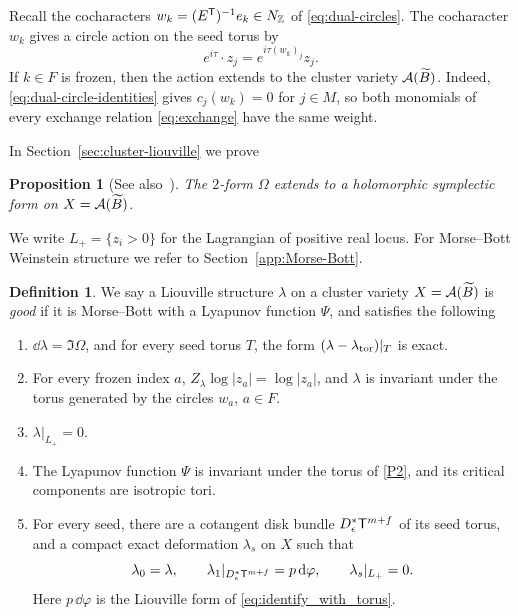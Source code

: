 \documentclass[12pt, letter]{amsart}
\newtheorem{proposition}[dummy]{Proposition}
\theoremstyle{definition}
\newtheorem{definition}[dummy]{Definition}
\begin{document}
Recall the cocharacters $w_k=(E^{\mathsf T})^{-1}e_k\in N_{\mathbb{Z}}$ of \eqref{eq:dual-circles}.
 The cocharacter $w_k$ gives a circle action on the seed torus by
\begin{equation}
\label{eq:circle_action}
e^{i\tau}\cdot z_j
=
e^{i\tau(w_k)_j}z_j.
\end{equation}
If \(k \in F\) is frozen, then the action extends to the cluster variety \(\mathcal{A}(\widetilde B)\). 
Indeed, \eqref{eq:dual-circle-identities} gives $c_j(w_k)=0$ for $j\in M$, so both monomials of every exchange relation \eqref{eq:exchange} have the same weight.

In Section~\ref{sec:cluster-liouville} we prove
\begin{proposition}[{See also~\cite[Theorem 4.4]{M}}]
    \label{prop:Omega}
    The \(2\)-form \(\Omega\) extends to a holomorphic symplectic form on \(X = \mathcal{A}(\widetilde B)\).
\end{proposition}


We write $L_+=\{z_i>0\}$ for the Lagrangian of positive real locus. For Morse--Bott Weinstein structure we refer to Section~\ref{app:Morse-Bott}. 


\begin{definition}
    We say a Liouville structure \(\lambda\) on a cluster variety \(X = \mathcal{A}(\widetilde B)\) is \emph{good} if it is Morse--Bott with a Lyapunov function \(\Psi\), and satisfies the following
\begin{enumerate}[label=\textup{(P\arabic*)}, series=P]
\item
\label{P1} 
\(\dd\lambda = \Im \Omega\), and for every seed torus $T$, the form $(\lambda-\lambda_{\mathrm{tor}})|_T$ is exact.

\item
\label{P2} 
For every frozen index $a$, $Z_{\lambda} \log|z_a|=\log|z_a|$, and $\lambda$ is invariant under the torus generated by the circles $w_a$, $a\in F$.

\item 
\label{P3}
$\lambda|_{L_+}= 0$.


\item
\label{P4} The Lyapunov  function $\Psi$ is invariant under the torus of \ref{P2}, and its critical components are isotropic tori.


\item
\label{P5}
For every seed, there are a cotangent disk bundle $D^*_\epsilon\mathsf T^{m+f}$ of its seed torus, and a compact exact deformation $\lambda_s$ on \(X\) such that
\[
 \lambda_0=\lambda,\qquad \lambda_1|_{D^*_\epsilon\mathsf T^{m+f}}=p\,\mathrm{d}\varphi,\qquad \lambda_s|_{L_+}=0 .
\]
Here $p\,\dd\varphi$ is the Liouville form of \eqref{eq:identify_with_torus}.

        
    \end{enumerate}
\end{definition}
\end{document}
